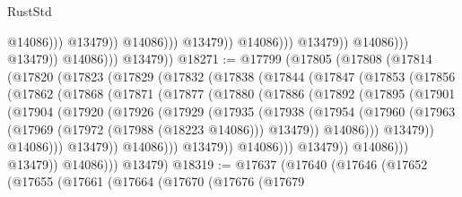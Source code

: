 \begin{lexlean}{RustStd}
\begin{coremodule}
                                                      @14086)))
                                                @13479))
                                            @14086)))
                                      @13479))
                                  @14086)))
                            @13479))
                        @14086)))
                  @13479))
              @14086)))
        @13479))
@18271 := @17799
    (@17805
      (@17808
        (@17814
          (@17820
            (@17823
              (@17829
                (@17832
                  (@17838
                    (@17844
                      (@17847
                        (@17853
                          (@17856
                            (@17862
                              (@17868
                                (@17871
                                  (@17877
                                    (@17880
                                      (@17886
                                        (@17892
                                          (@17895
                                            (@17901
                                              (@17904
                                                (@17920
                                                  (@17926
                                                    (@17929
                                                      (@17935
                                                        (@17938
                                                          (@17954
                                                            (@17960
                                                              (@17963
                                                                (@17969
                                                                  (@17972 (@17988 (@18223 @14086)))
                                                                  @13479))
                                                              @14086)))
                                                        @13479))
                                                    @14086)))
                                              @13479))
                                          @14086)))
                                    @13479))
                                @14086)))
                          @13479))
                      @14086)))
                @13479))
            @14086)))
      @13479)
@18319 := @17637
    (@17640
      (@17646
        (@17652
          (@17655
            (@17661
              (@17664
                (@17670
                  (@17676
                    (@17679

\end{coremodule}
\end{lexlean}
